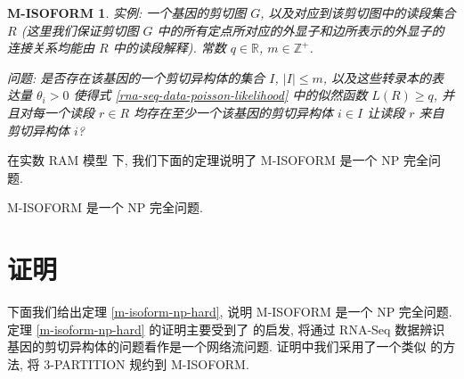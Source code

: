 \newtheorem*{misof}{M-ISOFORM}

\begin{misof}
\hspace*{1mm}

实例: 一个基因的剪切图 $G$, 以及对应到该剪切图中的读段集合 $R$ 
(这里我们保证剪切图 $G$ 中的所有定点所对应的外显子和边所表示的外显子的连接关系均能由 
$R$ 中的读段解释). 常数 $q \in \mathbb{R}$, $m \in \mathbb{Z}^+$. 

问题: 是否存在该基因的一个剪切异构体的集合 $I$, $|I| \leq m$, 
以及这些转录本的表达量 $\theta_i > 0$
使得式 \eqref{rna-seq-data-poisson-likelihood} 中的似然函数 $L(R) \geq q$, 
并且对每一个读段 $r \in R$ 均存在至少一个该基因的剪切异构体 $i\in I$ 
让读段 $r$ 来自剪切异构体 $i$?
\end{misof}

在实数 RAM 模型 \cite{Preparata:1985:CGI:4333} 下, 
我们下面的定理说明了 M-ISOFORM 是一个 NP 完全问题. 

\begin{thm}
\label{m-isoform-np-hard}
M-ISOFORM 是一个 NP 完全问题.
\end{thm}

\section{证明}

下面我们给出定理 \ref{m-isoform-np-hard}, 说明 M-ISOFORM 是一个 NP 完全问题. 
定理 \ref{m-isoform-np-hard} 的证明主要受到了  的启发, 
将通过 RNA-Seq 数据辨识基因的剪切异构体的问题看作是一个网络流问题. 
证明中我们采用了一个类似  的方法, 
将 3-PARTITION \cite{doi:10.1137/0204035, Garey:1990:CIG:574848} 规约到 M-ISOFORM. 

